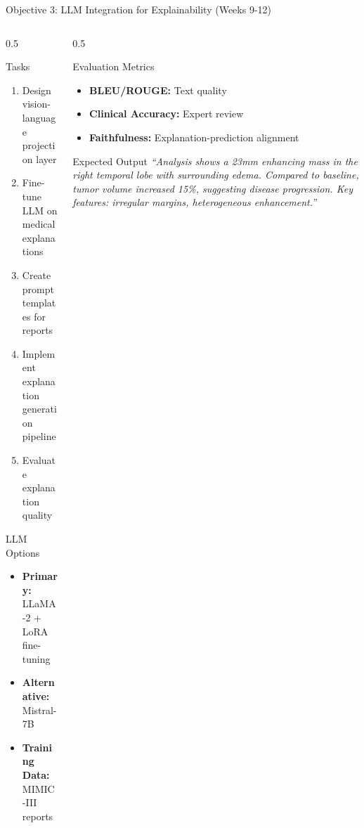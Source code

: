 \documentclass[aspectratio=169]{beamer}
\begin{document}
\begin{frame}{Objective 3: LLM Integration for Explainability (Weeks 9-12)}
    \begin{columns}
        \begin{column}{0.5\textwidth}
            \begin{block}{Tasks}
                \begin{enumerate}
                    \item Design vision-language projection layer
                    \item Fine-tune LLM on medical explanations
                    \item Create prompt templates for reports
                    \item Implement explanation generation pipeline
                    \item Evaluate explanation quality
                \end{enumerate}
            \end{block}
            
            \begin{block}{LLM Options}
                \begin{itemize}
                    \item \textbf{Primary:} LLaMA-2 + LoRA fine-tuning
                    \item \textbf{Alternative:} Mistral-7B
                    \item \textbf{Training Data:} MIMIC-III reports
                \end{itemize}
            \end{block}
        \end{column}
        \begin{column}{0.5\textwidth}
            \begin{block}{Evaluation Metrics}
                \begin{itemize}
                    \item \textbf{BLEU/ROUGE:} Text quality
                    \item \textbf{Clinical Accuracy:} Expert review
                    \item \textbf{Faithfulness:} Explanation-prediction alignment
                \end{itemize}
            \end{block}
            
            \begin{alertblock}{Expected Output}
                \textit{``Analysis shows a 23mm enhancing mass in the right temporal lobe with surrounding edema. Compared to baseline, tumor volume increased 15\%, suggesting disease progression. Key features: irregular margins, heterogeneous enhancement.''}
            \end{alertblock}
        \end{column}
    \end{columns}
\end{frame}
\end{document}
